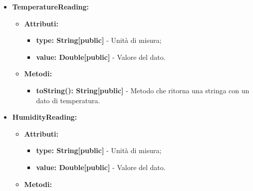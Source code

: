 \documentclass[8pt]{article}
\newcommand{\glossterm}[1]{#1\textsuperscript{G}} %
\begin{document}
\begin{itemize}
\begin{itemize}
\begin{itemize}
	\setlength\itemsep{0em}
            \item \textbf{join(temp: TemperatureTopic, humidity: HumidityTopic): HeatIndexTopic[public]} - Metodo per il join dei dati dei \glossterm{topic} di temperatura e umidità per la loro elaborazione e immissione nel \glossterm{topic} heat\_index;
            \item \textbf{calculateHeatIndex(temperature: double, humidity: double): double[private]} - Metodo che calcola la temperatura percepita.
        \end{itemize}
    \end{itemize}
    \item \textbf{TemperatureReading:}
    \begin{itemize}
	\setlength\itemsep{0em}
        \item \textbf{Attributi:}
        \begin{itemize}
	\setlength\itemsep{0em}
            \item \textbf{type: String[public]} - Unità di misura;
            \item \textbf{value: Double[public]} - Valore del dato.
        \end{itemize}
    \end{itemize}
    \begin{itemize}
	\setlength\itemsep{0em}
        \item \textbf{Metodi:}
        \begin{itemize}
	\setlength\itemsep{0em}
            \item \textbf{toString(): String[public]} - Metodo che ritorna una stringa con un dato di temperatura.
        \end{itemize}
    \end{itemize}
    \item \textbf{HumidityReading:}
    \begin{itemize}
	\setlength\itemsep{0em}
        \item \textbf{Attributi:}
        \begin{itemize}
	\setlength\itemsep{0em}
            \item \textbf{type: String[public]} - Unità di misura;
            \item \textbf{value: Double[public]} - Valore del dato.
        \end{itemize}
    \end{itemize}
    \begin{itemize}
	\setlength\itemsep{0em}
        \item \textbf{Metodi:}

\end{itemize}
\end{itemize}
\end{document}

